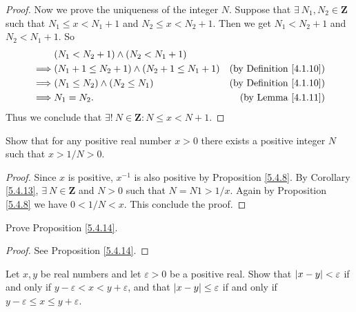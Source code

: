 \begin{proof}
Now we prove the uniqueness of the integer \(N\).
Suppose that \(\exists\ N_1, N_2 \in \mathbf{Z}\) such that \(N_1 \leq x < N_1 + 1\) and \(N_2 \leq x < N_2 + 1\).
Then we get \(N_1 < N_2 + 1\) and \(N_2 < N_1 + 1\).
So
\begin{align*}
& (N_1 < N_2 + 1) \land (N_2 < N_1 + 1) \\
\implies & (N_1 + 1 \leq N_2 + 1) \land (N_2 + 1 \leq N_1 + 1) & \text{(by Definition \ref{4.1.10})} \\
\implies & (N_1 \leq N_2) \land (N_2 \leq N_1) & \text{(by Definition \ref{4.1.10})} \\
\implies & N_1 = N_2. & \text{(by Lemma \ref{4.1.11})}
\end{align*}
Thus we conclude that \(\exists!\ N \in \mathbf{Z} : N \leq x < N + 1\).
\end{proof}

\begin{exercise}\label{ex 5.4.4}
Show that for any positive real number \(x > 0\) there exists a positive integer \(N\) such that \(x > 1 / N > 0\).
\end{exercise}

\begin{proof}
Since \(x\) is positive, \(x^{-1}\) is also positive by Proposition \ref{5.4.8}.
By Corollary \ref{5.4.13}, \(\exists\ N \in \mathbf{Z}\) and \(N > 0\) such that \(N = N1 > 1 / x\).
Again by Proposition \ref{5.4.8} we have \(0 < 1 / N < x\).
This conclude the proof.
\end{proof}

\begin{exercise}\label{ex 5.4.5}
Prove Proposition \ref{5.4.14}.
\end{exercise}

\begin{proof}
See Proposition \ref{5.4.14}.
\end{proof}

\begin{exercise}\label{ex 5.4.6}
Let \(x, y\) be real numbers and let \(\varepsilon > 0\) be a positive real.
Show that \(\abs*{x - y} < \varepsilon\) if and only if \(y - \varepsilon < x < y + \varepsilon\), and that \(\abs*{x - y} \leq \varepsilon\) if and only if \(y - \varepsilon \leq x \leq y + \varepsilon\).
\end{exercise}

